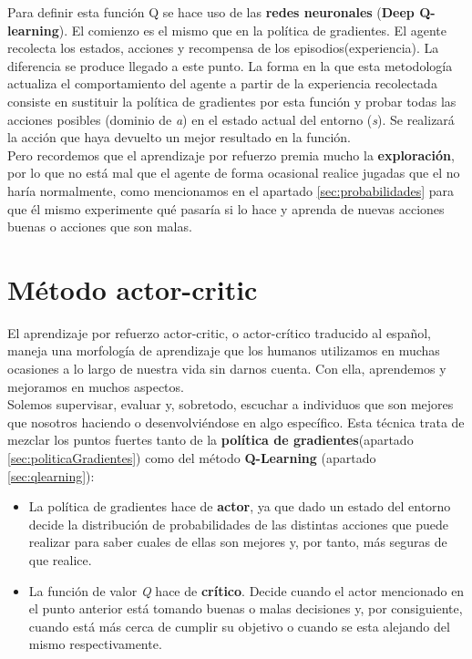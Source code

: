 \documentclass[11pt,fleqn]{book} %
\begin{document}
Para definir esta función Q se hace uso de las \textbf{redes neuronales} (\textbf{Deep Q-learning}). El comienzo es el mismo que en la política de gradientes. El agente recolecta los estados, acciones y recompensa de los episodios(experiencia). La diferencia se produce llegado a este punto. La forma en la que esta metodología actualiza el comportamiento del agente a partir de la experiencia recolectada consiste en sustituir la política de gradientes por esta función y probar todas las acciones posibles (dominio de \textit{a}) en el estado actual del entorno (\textit{s}). Se realizará la acción que haya devuelto un mejor resultado en la función. \\

Pero recordemos que el aprendizaje por refuerzo premia mucho la \textbf{exploración}, por lo que no está mal que el agente de forma ocasional realice jugadas que el no haría normalmente, como mencionamos en el apartado \ref{sec:probabilidades} para que él mismo experimente qué pasaría si lo hace y aprenda de nuevas acciones buenas o acciones que son malas.


\section{Método actor-critic}\label{sec:actorcritic}

El aprendizaje por refuerzo actor-critic, o actor-crítico traducido al español, maneja una morfología de aprendizaje que los humanos utilizamos en muchas ocasiones a lo largo de nuestra vida sin darnos cuenta. Con ella, aprendemos y mejoramos en muchos aspectos. \\

Solemos supervisar, evaluar y, sobretodo, escuchar a individuos que son mejores que nosotros haciendo o desenvolviéndose en algo específico. Esta técnica trata de mezclar los puntos fuertes tanto de la \textbf{política de gradientes}(apartado \ref{sec:politicaGradientes}) como del método \textbf{Q-Learning} (apartado \ref{sec:qlearning}): \\

\begin{itemize}
	\item La política de gradientes hace de \textbf{actor}, ya que dado un estado del entorno decide la distribución de probabilidades de las distintas acciones que puede realizar para saber cuales de ellas son mejores y, por tanto, más seguras de que realice. \\
	
	\item La función de valor \textit{Q} hace de \textbf{crítico}. Decide cuando el actor mencionado en el punto anterior está tomando buenas o malas decisiones y, por consiguiente, cuando está más cerca de cumplir su objetivo o cuando se esta alejando del mismo respectivamente. \\
\end{itemize}
\end{document}
